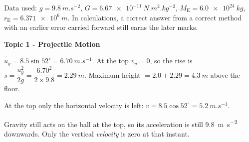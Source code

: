 \documentclass[12pt]{article}
\newcommand\anstopic[1]{\par\Needspace{8\baselineskip}\vspace{4mm}%
  \begin{center}{\headfont\bfseries\fontsize{14}{18}\selectfont #1\par}\end{center}\vspace{2pt}}
\begin{document}

Data used: $g = \qty{9.8}{m.s^{-2}}$, $G = \qty{6.67e-11}{N.m^2.kg^{-2}}$,
$M_\mathrm{E} = \qty{6.0e24}{kg}$, $r_\mathrm{E} = \qty{6.371e6}{m}$. In calculations, a correct
answer from a correct method with an earlier error carried forward still earns the later marks.

\anstopic{Topic 1 - Projectile Motion}

\ansq
{}
\begin{crit}
\end{crit}
\sample
$u_y = 8.5\sin 52^\circ = \qty{6.70}{m.s^{-1}}$. At the top $v_y = 0$, so the rise is
$s = \dfrac{u_y^2}{2g} = \dfrac{6.70^2}{2 \times 9.8} = \qty{2.29}{m}$.
Maximum height $= 2.0 + 2.29 = \qty{4.3}{m}$ above the floor.
\begin{crit}
\end{crit}
\sample
At the top only the horizontal velocity is left: $v = 8.5\cos 52^\circ = \qty{5.2}{m.s^{-1}}$.
\begin{crit}
\end{crit}
\sample
Gravity still acts on the ball at the top, so its acceleration is still \qty{9.8}{m.s^{-2}} downwards.
Only the vertical \emph{velocity} is zero at that instant.
\end{document}
